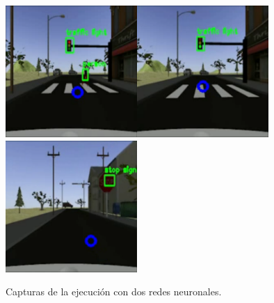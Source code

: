 \begin{figure} [h!]
	\begin{center}
		\includegraphics[width=5cm]{figs/simRed}\hspace{0.1cm}\includegraphics[width=5cm]{figs/simGreen}\hspace{0.1cm}\includegraphics[width=5cm]{figs/simStop}
	\end{center}
	\caption{Capturas de la ejecución con dos redes neuronales.}
	\label{fig:simexecution}
\end{figure}\

